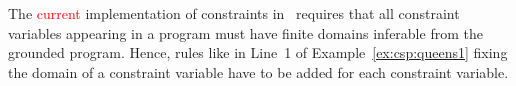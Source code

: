 \begin{note}
The \textcolor{red}{current} implementation of constraints in \gringo\ requires 
that all constraint variables appearing in a program must have finite domains inferable from the grounded program.
Hence, rules like in Line~1 of Example~\ref{ex:csp:queens1} fixing the domain of a constraint variable have to be added for each constraint variable.
\end{note}

